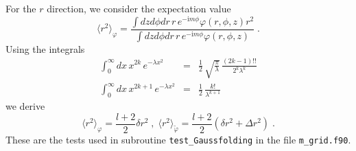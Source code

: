 \documentclass[12pt]{article}
\begin{document}
For the $r$ direction, we consider the expectation value
\begin{equation}
  \langle r^2\rangle_\varphi
  =
  \frac{\int dz d\phi dr\,r\,e^{-\mathrm{i}m\phi}\varphi(r,\phi,z)r^2}
       {\int dz d\phi dr\,r\,e^{-\mathrm{i}m\phi}\varphi(r,\phi,z)}
  \;.
\end{equation}
Using the integrals
\begin{eqnarray*}
  \int_0^\infty dx\,x^{2k}\,e^{-\lambda x^2}
  &=&
  \frac{1}{2}\,\sqrt{\frac{\pi}{\lambda}}\,\frac{(2k-1)!!}{2^k\lambda^k}
\\
  \int_0^\infty dx\,x^{2k+1}\,e^{-\lambda x^2}
  &=&
  \frac{1}{2}\,\frac{k!}{\lambda^{k+1}}
\end{eqnarray*}
we derive
\begin{equation}
  \langle r^2\rangle_\varphi
  =
  \frac{l+2}{2}\delta r^2
  \;,\;
  \langle r^2\rangle_{\tilde\varphi}
  =
  \frac{l+2}{2}(\delta r^2+\Delta r^2)
  \;.
\end{equation}
These are the tests used in subroutine \texttt{test\_Gaussfolding} in
the file \texttt{m\_grid.f90}.
\end{document}
